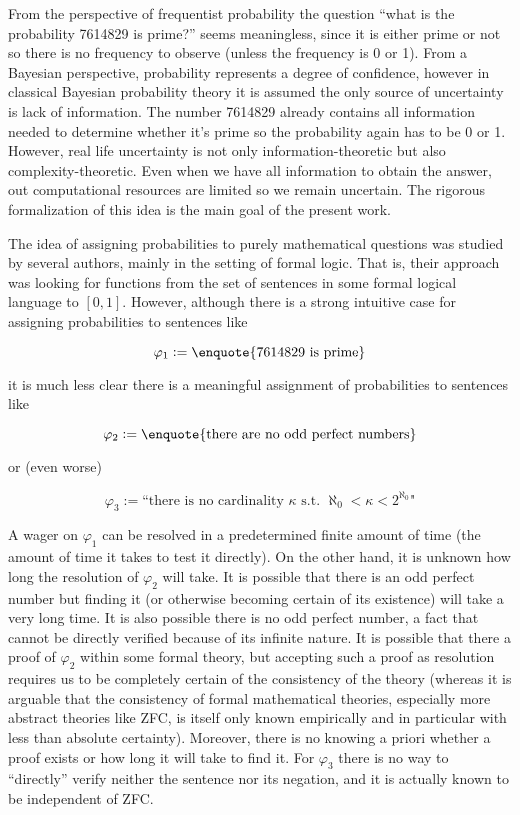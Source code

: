 \documentclass{article}
\numberwithin{equation}{section}
\theoremstyle{definition}
\theoremstyle{plain}
\begin{document}
From the perspective of frequentist probability the question \enquote{what is the probability 7614829 is prime?} seems meaningless, since it is either prime or not so there is no frequency to observe (unless the frequency is 0 or 1). From a Bayesian perspective, probability represents a degree of confidence, however in classical Bayesian probability theory it is assumed the only source of uncertainty is lack of information. The number 7614829 already contains all information needed to determine whether it's prime so the probability again has to be 0 or 1. However, real life uncertainty is not only information-theoretic but also complexity-theoretic. Even when we have all information to obtain the answer, out computational resources are limited so we remain uncertain. The rigorous formalization of this idea is the main goal of the present work.

The idea of assigning probabilities to purely mathematical questions was studied by several authors\cite{Gaifman_2004,Hutter_2013,Demski_2012,Christiano_2014,Garrabrant_2015}, mainly in the setting of formal logic. That is, their approach was looking for functions from the set of sentences in some formal logical language to $[0,1]$. However, although there is a strong intuitive case for assigning probabilities to sentences like

\[\varphi_1:=\text{\enquote{7614829 is prime}}\]

it is much less clear there is a meaningful assignment of probabilities to sentences like 

\[\varphi_2 := \text{\enquote{there are no odd perfect numbers}}\] 

or (even worse) 

\[\varphi_3 := \text{``there is no cardinality } \kappa \text{ s.t. } \aleph_0 < \kappa < 2^{\aleph_0} \text{"}\]

A wager on $\varphi_1$ can be resolved in a predetermined finite amount of time (the amount of time it takes to test it directly). On the other hand, it is unknown how long the resolution of $\varphi_2$ will take. It is possible that there is an odd perfect number but finding it (or otherwise becoming certain of its existence) will take a very long time. It is also possible there is no odd perfect number, a fact that cannot be directly verified because of its infinite nature. It is possible that there a proof of $\varphi_2$ within some formal theory, but accepting such a proof as resolution requires us to be completely certain of the consistency of the theory (whereas it is arguable that the consistency of formal mathematical theories, especially more abstract theories like ZFC, is itself only known empirically and in particular with less than absolute certainty). Moreover, there is no knowing a priori whether a proof exists or how long it will take to find it. For $\varphi_3$ there is no way to \enquote{directly} verify neither the sentence nor its negation, and it is actually known to be independent of ZFC.
\end{document}
